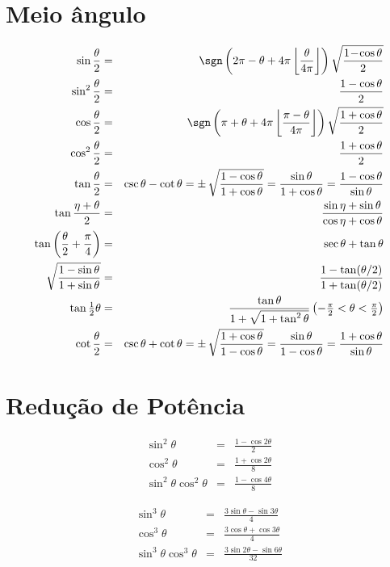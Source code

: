 \section{Meio ângulo}

\begin{eqnarray}
\sin \frac{\theta}{2} &=& \sgn \left(2 \pi - \theta + 4 \pi \left\lfloor \frac{\theta}{4\pi} \right\rfloor \right) \sqrt{\frac{1 \! - \! \cos \theta}{2}}\\
\sin^2\frac{\theta}{2} &=& \frac{1-\cos\theta}{2}\\
\cos \frac{\theta}{2} &=& \sgn \left(\pi + \theta + 4 \pi \left\lfloor \frac{\pi - \theta}{4\pi} \right\rfloor \right) \sqrt{\frac{1 + \cos\theta}{2}}\\
\cos^2\frac{\theta}{2} &=&\frac{1+\cos\theta}{2}\\
\tan \frac{\theta}{2} &=& \csc \theta - \cot \theta = \pm\, \sqrt{1 - \cos \theta \over 1 + \cos \theta} = \frac{\sin \theta}{1 + \cos \theta} = \frac{1-\cos \theta}{\sin \theta} \\
\tan\frac{\eta+\theta}{2} &=& \frac{\sin\eta+\sin\theta}{\cos\eta+\cos\theta} \\
\tan\left(\frac{\theta}{2} + \frac{\pi}{4}\right) &= &\sec\theta + \tan\theta \\
\sqrt{\frac{1 - \sin\theta}{1 + \sin\theta}}  &= &\frac{1 - \tan(\theta/2)}{1 + \tan(\theta/2)}\\
\tan\tfrac{1}{2}\theta  &=& \frac{\tan\theta}{1 + \sqrt{1+\tan^2\theta}} \left(-\tfrac{\pi}{2} < \theta < \tfrac{\pi}{2} \right)\\
\cot \frac{\theta}{2} & =& \csc \theta + \cot \theta = \pm\, \sqrt{1 + \cos \theta \over 1 - \cos \theta} = \frac{\sin \theta}{1 - \cos \theta} = \frac{1 + \cos \theta}{\sin \theta} 
\end{eqnarray}


\section{Redução de Potência}

\begin{eqnarray}
\sin^2\theta &=& \frac{1 - \cos 2\theta}{2}\\
\cos^2\theta &=& \frac{1 + \cos 2\theta}{8}\\
\sin^2\theta \cos^2\theta &=& \frac{1 - \cos 4\theta}{8}
\end{eqnarray}


\begin{eqnarray}
\sin^3\theta &=& \frac{3 \sin\theta - \sin 3\theta}{4}\\
\cos^3\theta &=& \frac{3 \cos\theta + \cos 3\theta}{4}\\
\sin^3\theta \cos^3\theta &=& \frac{3\sin 2\theta - \sin 6\theta}{32}
\end{eqnarray}



